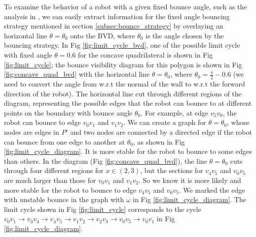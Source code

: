 \documentclass[]{styles/svproc}  %
\begin{document}
To examine the behavior of a robot with a given fixed bounce angle, such as the
analysis in \cite{ErLav13}, we can easily extract information for the fixed angle bouncing strategy
mentioned in section \ref{subsec:bounce_strategy} by overlaying an horizontal
line $\theta = \theta_0$ onto the BVD, where $\theta_0$ is the angle chosen by
the bouncing strategy. In Fig \ref{fig:limit_cycle_bvd}, one of the possible
limit cycle with fixed angle $\theta = 0.6$ for the concave quadrilateral is
shown in Fig \ref{fig:limit_cycle}; the bounce visibility diagram for this
polygon is shown in Fig \ref{fig:concave_quad_bvd} with the horizontal line
$\theta = \theta_0$, where $\theta_0 = \frac{\pi}{2}-0.6$ (we need to convert
the angle from w.r.t the normal of the wall to w.r.t the forward direction of
the robot). The horizontal line cut through different regions of the diagram,
representing the possible edges that the robot can bounce to at different points
on the boundary with bounce angle $\theta_0$. For example, at edge $v_5v_0$, the
robot can bounce to edge $v_0v_1$ and $v_1v_2$. We can create a graph for
$\theta = \theta_0$, whose nodes are edges in $P'$ and two nodes are connected
by a directed edge if the robot can bounce from one edge to another at
$\theta_0$, as shown in Fig \ref{fig:limit_cycle_diagram}. It is more stable
for the robot to bounce to some edges than others. In the diagram
(Fig \ref{fig:concave_quad_bvd}), the line $\theta = \theta_0$ cuts through
four different regions for $x \in (2, 3)$, but the sections for $v_4v_5$ and
$v_0v_5$ are much larger than those for $v_0v_1$ and $v_1v_2$. So we know it is
more likely and more stable for the robot to bounce to edge $v_4v_5$ and
$v_0v_5$. We marked the edge with unstable bounce in the graph with $\omega$ in
Fig \ref{fig:limit_cycle_diagram}. The limit cycle shown in
Fig \ref{fig:limit_cycle} corresponds to the cycle
$v_0v_1\rightarrow v_3v_4\rightarrow v_4v_5 \rightarrow v_1v_2 \rightarrow v_2v_3 \rightarrow v_0v_5 \rightarrow v_0v_1$
in Fig \ref{fig:limit_cycle_diagram}.
\end{document}
